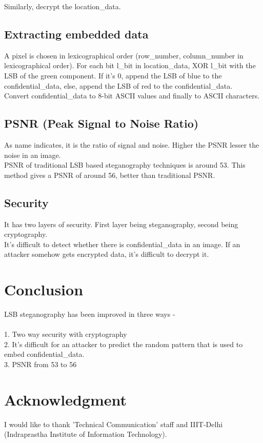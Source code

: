 \documentclass[conference]{IEEEtran}
\begin{document}
Similarly, decrypt the location\_data. \\
\subsection{Extracting embedded data}
A pixel is chosen in lexicographical order (row\_number, column\_number in lexicographical order).
For each bit l\_bit in location\_data, XOR l\_bit with the LSB of the green component.
If it's 0, append the LSB of blue to the confidential\_data, else, append the LSB of red to the confidential\_data.\\

Convert confidential\_data to 8-bit ASCII values and finally to ASCII characters.\\
\subsection{PSNR (Peak Signal to Noise Ratio)}
As name indicates, it is the ratio of signal and noise.
Higher the PSNR lesser the noise in an image.\\

PSNR of traditional LSB based steganography techniques is around 53.
This method gives a PSNR of around 56, better than traditional PSNR.\\  
\subsection{Security}
It has two layers of security.
First layer being steganography, second being cryptography.\\

It's difficult to detect whether there is confidential\_data in an image.
If an attacker somehow gets encrypted data, it's difficult to decrypt it.\\
\section{Conclusion}
LSB steganography has been improved in three ways -\\ \\
1. Two way security with cryptography\\
2. It's difficult for an attacker to predict the random pattern that is used to embed confidential\_data.\\
3. PSNR from 53 to 56 \\
\section*{Acknowledgment}
I would like to thank 'Technical Communication' staff and IIIT-Delhi (Indraprastha Institute of Information Technology).\\
\end{document}
